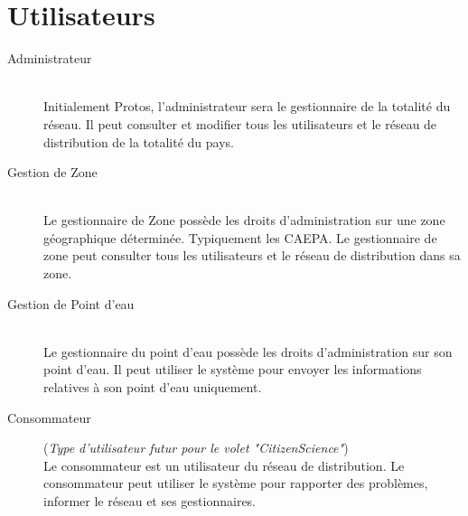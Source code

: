 \documentclass[a4paper, 11pt]{article}
\begin{document}
\section{Utilisateurs}
\begin{description}
  \item[Administrateur] ~ \\
  Initialement Protos, l'administrateur sera le gestionnaire de la totalité du réseau. Il peut consulter et modifier tous les utilisateurs et le réseau de distribution de la totalité du pays.

  \item[Gestion de Zone] ~ \\
  Le gestionnaire de Zone possède les droits d'administration sur une zone géographique déterminée. Typiquement les CAEPA. Le gestionnaire de zone peut consulter tous les utilisateurs et le réseau de distribution dans sa zone.

  \item[Gestion de Point d'eau] ~ \\
  Le gestionnaire du point d'eau possède les droits d'administration sur son point d'eau. Il peut utiliser le système pour envoyer les informations relatives à son point d'eau uniquement.

  \item[Consommateur](\emph{Type d'utilisateur futur pour le volet "CitizenScience"}) \\
  Le consommateur est un utilisateur du réseau de distribution. Le consommateur peut utiliser le système pour rapporter des problèmes, informer le réseau et ses gestionnaires.
\end{description}
\end{document}
